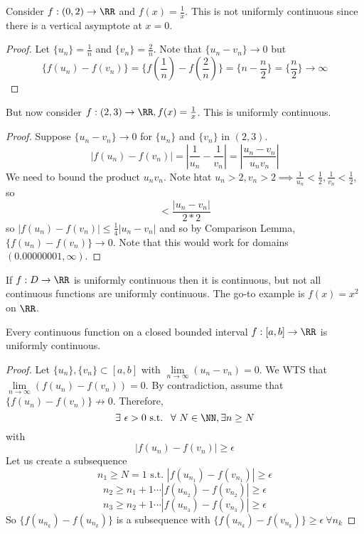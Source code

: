 \documentclass[12pt]{scrartcl}
\newcommand{\Lim}{\underset{n\to\infty}{\lim}}
\begin{document}
\begin{example}
  Consider $f: (0, 2) \to \RR$ and $f(x) = \frac{1}{x}$. This is not uniformly continuous
  since there is a vertical asymptote at $x=0$. 

  \begin{proof}
    Let $\{u_n\} = \frac{1}{n}$ and $\{v_n\} = \frac{2}{n}$. Note that $\{u_n - v_n\} \to 0$ but 
    \[\{f(u_n) - f(v_n)\} = \{f(\frac{1}{n}) - f(\frac{2}{n})\} = \{n - \frac{n}{2}\} = \{\frac{n}{2}\} \to \infty\]
  \end{proof}

  But now consider $f: (2, 3) \to \RR, f(x) = \frac{1}{x}$. This is uniformly continuous.

  \begin{proof}
    Suppose $\{u_n - v_n\} \to 0$ for $\{u_n\}$ and $\{v_n\}$ in $(2,3)$. 
    \[|f(u_n) - f(v_n)| = |\frac{1}{u_n} - \frac{1}{v_n}| = |\frac{u_n - v_n}{u_n v_n}|\]
    We need to bound the product $u_nv_n$. Note htat $u_n > 2, v_n > 2 \implies \frac{1}{u_n} < \frac{1}{2}, \frac{1}{v_n} < \frac{1}{2}$, 
    so 
    \[< \frac{|u_n - v_n|}{2 * 2}\]
    so $|f(u_n) - f(v_n)| \leq \frac{1}{4}|u_n - v_n|$ and so by Comparison Lemma, $\{f(u_n) - f(v_n)\} \to 0$.
    Note that this would work for domains $(0.00000001, \infty)$.
  \end{proof}
\end{example}

\begin{note}
  If $f: D \to \RR$ is uniformly continuous then it is continuous, but not all 
  continuous functions are uniformly continuous. The go-to example is 
  $f(x) = x^2$ on $\RR$.
\end{note}

\begin{theorem}
  Every continuous function on a closed bounded interval $f: [a,b] \to \RR$ is uniformly continuous.
  \begin{proof}
    Let $\{u_n\}, \{v_n\} \subset [a,b]$ with $\Lim (u_n - v_n)= 0$. We WTS that 
    $\Lim (f(u_n) - f(v_n)) = 0$. By contradiction, assume that $\{f(u_n) - f(v_n)\} \not \to 0$. 
    Therefore, 
    \[\exists \ \epsilon > 0 \text{ s.t. } \ \forall \ N \in \NN, \exists n \geq N\] with 
    \[|f(u_n) - f(v_n)| \geq \epsilon\]
    Let us create a subsequence
    \[n_1 \geq N = 1 \text{ s.t. } |f(u_{n_1}) - f(v_{n_1})| \geq \epsilon\]
    \[n_2 \geq n_1 + 1 \cdots |f(u_{n_2}) - f(v_{n_2})| \geq \epsilon\]
    \[n_3 \geq n_2 + 1 \cdots |f(u_{n_3}) - f(v_{n_3})| \geq \epsilon\]
    So $\{f(u_{n_k}) - f(u_{n_k})\}$ is a subsequence with 
    $\{f(u_{n_k}) - f(v_{n_k})\} \geq \epsilon \ \forall n_k$
  \end{proof}
\end{theorem}
\end{document}
